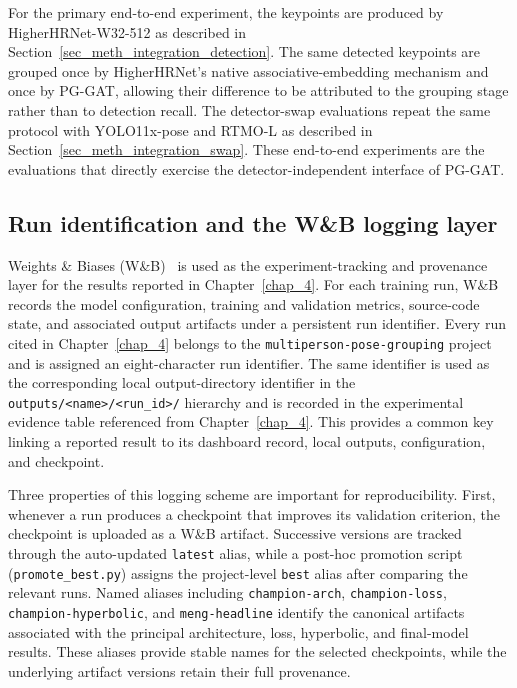 For the primary end-to-end experiment,
the keypoints are produced by HigherHRNet-W32-512 as described in
Section~\ref{sec_meth_integration_detection}.
The same detected keypoints are grouped once by HigherHRNet's native
associative-embedding mechanism
and once by PG-GAT,
allowing their difference to be attributed to the grouping stage
rather than to detection recall.
The detector-swap evaluations repeat the same protocol with
YOLO11x-pose and RTMO-L as described in
Section~\ref{sec_meth_integration_swap}.
These end-to-end experiments are the evaluations that directly exercise
the detector-independent interface of PG-GAT.

\subsection{Run identification and the W\&B logging layer}
\label{sec_meth_evaluation_wandb}

Weights \& Biases (W\&B)~\cite{wandb} is used as the experiment-tracking
and provenance layer for the results reported in Chapter~\ref{chap_4}.
For each training run,
W\&B records the model configuration,
training and validation metrics,
source-code state,
and associated output artifacts under a persistent run identifier.
Every run cited in Chapter~\ref{chap_4} belongs to the
\texttt{multiperson-pose-grouping} project
and is assigned an eight-character run identifier.
The same identifier is used as the corresponding local output-directory
identifier in the \texttt{outputs/<name>/<run\_id>/} hierarchy
and is recorded in the experimental evidence table referenced
from Chapter~\ref{chap_4}.
This provides a common key linking a reported result to its dashboard
record,
local outputs,
configuration,
and checkpoint.

Three properties of this logging scheme are important for
reproducibility.
First,
whenever a run produces a checkpoint that improves its validation
criterion,
the checkpoint is uploaded as a W\&B artifact.
Successive versions are tracked through the auto-updated
\texttt{latest} alias,
while a post-hoc promotion script (\texttt{promote\_best.py})
assigns the project-level \texttt{best} alias after comparing
the relevant runs.
Named aliases including \texttt{champion-arch},
\texttt{champion-loss},
\texttt{champion-hyperbolic},
and \texttt{meng-headline} identify the canonical artifacts
associated with the principal architecture,
loss,
hyperbolic,
and final-model results.
These aliases provide stable names for the selected checkpoints,
while the underlying artifact versions retain their full provenance.

